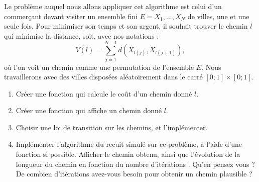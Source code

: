 \documentclass[a4paper]{article}
\begin{document}
Le problème auquel nous allons appliquer cet algorithme est celui d'un commerçant devant visiter un ensemble fini $E={X_1,...,X_N}$ de villes, une et une seule fois. Pour minimiser son temps et son argent, il souhait trouver le chemin $l$ qui minimise la distance, soit, avec nos notations :
\[V(l)=\sum_{j=1}^{N-1} d(X_{l(j)},X_{l(j+1)}),\]
où l'on voit un chemin comme une permutation de l'ensemble $E$. Nous travaillerons avec des villes disposées aléatoirement dans le carré $[0;1]\times [0;1]$.
 
\begin{enumerate}
\item Créer une fonction qui calcule le coût d'un chemin donné $l$.
\item Créer une fonction qui affiche un chemin donné $l$.
\item Choisir une loi de transition sur les chemins, et l'implémenter.
\item Implémenter l'algorithme du recuit simulé sur ce problème, à l'aide d'une fonction si possible. Afficher le chemin obtenu, ainsi que l'évolution de la longueur du chemin en fonction du nombre d'itérations . Qu'en pensez vous ? De combien d'itérations avez-vous besoin pour obtenir un chemin plausible ? 
\end{enumerate}
\end{document}
